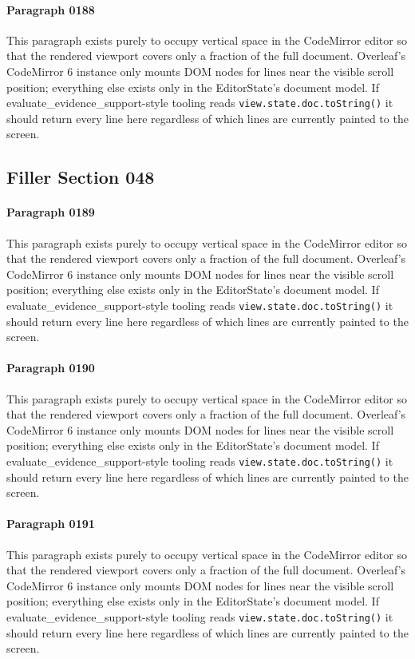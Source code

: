 \documentclass{article}
\begin{document}
\paragraph{Paragraph 0188}
This paragraph exists purely to occupy vertical space in the CodeMirror editor so that the rendered viewport covers only a fraction of the full document. Overleaf's CodeMirror 6 instance only mounts DOM nodes for lines near the visible scroll position; everything else exists only in the EditorState's document model. If evaluate\_evidence\_support-style tooling reads \texttt{view.state.doc.toString()} it should return every line here regardless of which lines are currently painted to the screen.

\subsection{Filler Section 048}
\paragraph{Paragraph 0189}
This paragraph exists purely to occupy vertical space in the CodeMirror editor so that the rendered viewport covers only a fraction of the full document. Overleaf's CodeMirror 6 instance only mounts DOM nodes for lines near the visible scroll position; everything else exists only in the EditorState's document model. If evaluate\_evidence\_support-style tooling reads \texttt{view.state.doc.toString()} it should return every line here regardless of which lines are currently painted to the screen.

\paragraph{Paragraph 0190}
This paragraph exists purely to occupy vertical space in the CodeMirror editor so that the rendered viewport covers only a fraction of the full document. Overleaf's CodeMirror 6 instance only mounts DOM nodes for lines near the visible scroll position; everything else exists only in the EditorState's document model. If evaluate\_evidence\_support-style tooling reads \texttt{view.state.doc.toString()} it should return every line here regardless of which lines are currently painted to the screen.

\paragraph{Paragraph 0191}
This paragraph exists purely to occupy vertical space in the CodeMirror editor so that the rendered viewport covers only a fraction of the full document. Overleaf's CodeMirror 6 instance only mounts DOM nodes for lines near the visible scroll position; everything else exists only in the EditorState's document model. If evaluate\_evidence\_support-style tooling reads \texttt{view.state.doc.toString()} it should return every line here regardless of which lines are currently painted to the screen.
\end{document}
